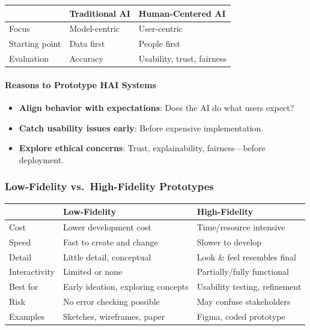 \begin{center}
\renewcommand{\arraystretch}{1.3}
\begin{tabular}{@{} l p{5cm} p{5cm} @{}}
\toprule
& \textbf{Traditional AI} & \textbf{Human-Centered AI} \\
\midrule
Focus & Model-centric & User-centric \\
Starting point & Data first & People first \\
Evaluation & Accuracy & Usability, trust, fairness \\
\bottomrule
\end{tabular}
\end{center}

\paragraph*{Reasons to Prototype HAI Systems}
\begin{itemize}
  \item \textbf{Align behavior with expectations}: Does the AI do what users expect?
  \item \textbf{Catch usability issues early}: Before expensive implementation.
  \item \textbf{Explore ethical concerns}: Trust, explainability, fairness---before deployment.
\end{itemize}

\subsubsection*{Low-Fidelity vs.\ High-Fidelity Prototypes}

\begin{center}
\renewcommand{\arraystretch}{1.3}
\begin{tabular}{@{} l p{5.5cm} p{5.5cm} @{}}
\toprule
& \textbf{Low-Fidelity} & \textbf{High-Fidelity} \\
\midrule
Cost & Lower development cost & Time/resource intensive \\
Speed & Fast to create and change & Slower to develop \\
Detail & Little detail, conceptual & Look \& feel resembles final \\
Interactivity & Limited or none & Partially/fully functional \\
Best for & Early ideation, exploring concepts & Usability testing, refinement \\
Risk & No error checking possible & May confuse stakeholders \\
Examples & Sketches, wireframes, paper & Figma, coded prototype \\
\bottomrule
\end{tabular}
\end{center}

